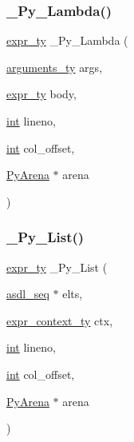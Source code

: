 \subsubsection{\texorpdfstring{\_Py\_Lambda()}{\_Py\_Lambda()}}
{\footnotesize\ttfamily \mbox{\hyperlink{_python-ast_8h_a56d3705e020a071405094a220c4592bd}{expr\+\_\+ty}} \+\_\+\+Py\+\_\+\+Lambda (\begin{DoxyParamCaption}\item[{\mbox{\hyperlink{_python-ast_8h_a45cc6e94d598fdc335d8c85739108a3e}{arguments\+\_\+ty}}}]{args,  }\item[{\mbox{\hyperlink{_python-ast_8h_a56d3705e020a071405094a220c4592bd}{expr\+\_\+ty}}}]{body,  }\item[{\mbox{\hyperlink{warnings_8h_a74f207b5aa4ba51c3a2ad59b219a423b}{int}}}]{lineno,  }\item[{\mbox{\hyperlink{warnings_8h_a74f207b5aa4ba51c3a2ad59b219a423b}{int}}}]{col\+\_\+offset,  }\item[{\mbox{\hyperlink{pyarena_8h_a9edeb357fbb27333471022a0975adb7a}{Py\+Arena}} $\ast$}]{arena }\end{DoxyParamCaption})}

\mbox{\label{_python-ast_8h_a60f89e3a3bd0f6d993ddcc2c3a3eb9f0}} 
\subsubsection{\texorpdfstring{\_Py\_List()}{\_Py\_List()}}
{\footnotesize\ttfamily \mbox{\hyperlink{_python-ast_8h_a56d3705e020a071405094a220c4592bd}{expr\+\_\+ty}} \+\_\+\+Py\+\_\+\+List (\begin{DoxyParamCaption}\item[{\mbox{\hyperlink{structasdl__seq}{asdl\+\_\+seq}} $\ast$}]{elts,  }\item[{\mbox{\hyperlink{_python-ast_8h_a38710ce394ed6d5cc8ebe79a322dcdf9}{expr\+\_\+context\+\_\+ty}}}]{ctx,  }\item[{\mbox{\hyperlink{warnings_8h_a74f207b5aa4ba51c3a2ad59b219a423b}{int}}}]{lineno,  }\item[{\mbox{\hyperlink{warnings_8h_a74f207b5aa4ba51c3a2ad59b219a423b}{int}}}]{col\+\_\+offset,  }\item[{\mbox{\hyperlink{pyarena_8h_a9edeb357fbb27333471022a0975adb7a}{Py\+Arena}} $\ast$}]{arena }\end{DoxyParamCaption})}

